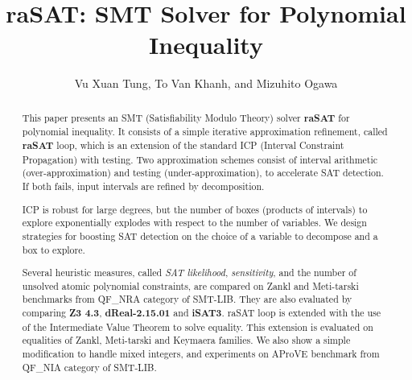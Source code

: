 \documentclass[runningheads,a4paper,oribibl]{llncs}
\begin{document}
%
\title{{\bf raSAT}: SMT Solver for Polynomial Inequality}

\author{Vu Xuan Tung, To Van Khanh, and Mizuhito Ogawa} 


\maketitle

\begin{abstract}
This paper presents an SMT (Satisfiability Modulo Theory) solver {\bf raSAT} for polynomial inequality. 
It consists of a simple iterative approximation refinement, called {\bf raSAT} loop, 
which is an extension of the standard ICP (Interval Constraint Propagation) with testing. 
Two approximation schemes consist of interval arithmetic (over-approximation) and 
testing (under-approximation), to accelerate SAT detection. 
If both fails, input intervals are refined by decomposition. 

ICP is robust for large degrees, but the number of boxes (products of intervals) to explore 
exponentially explodes with respect to the number of variables. 
We design strategies for boosting SAT detection on the choice of a variable to decompose
and a box to explore. 

Several heuristic measures, called {\em SAT likelihood}, {\em sensitivity}, and the number of 
unsolved atomic polynomial constraints, are compared on Zankl and Meti-tarski benchmarks from 
QF\_NRA category of SMT-LIB. They are also evaluated by comparing {\bf Z3 4.3}, \textbf{dReal-2.15.01} and {\bf iSAT3}. 
raSAT loop is extended with the use of the Intermediate Value Theorem to solve equality. This extension is evaluated on equalities of Zankl, Meti-tarski and Keymaera families.
We also show a simple modification to handle mixed integers, and experiments on 
AProVE benchmark from QF\_NIA category of SMT-LIB. 
\end{abstract}
\end{document}
